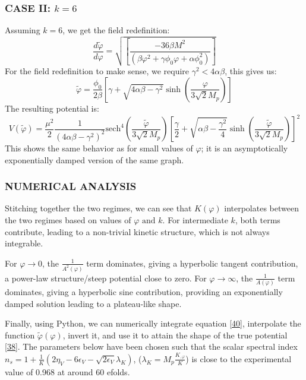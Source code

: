 \documentclass[aps,prd,reprint,preprintnumbers,showpacs,floatfix,nofootinbib,superscript address]{revtex4-2}
\begin{document}
\subsubsection{\textbf{CASE II}: $k = 6$}
Assuming $k=6$,  we get the field redefinition:
\begin{equation}
    \frac{d\tilde{\varphi}}{d\varphi} = \sqrt{\left[\frac{-36 \beta M^2}{(\beta \varphi^2 + \gamma\phi_0\varphi + \alpha \phi_0^2)} \right]}
\end{equation}
For the field redefinition to make sense, we require $\gamma^2 < 4\alpha \beta$, this gives us:
\begin{equation}
    \tilde{\varphi} = \frac{\phi_0}{2\beta} \left[\gamma + \sqrt{4\alpha\beta - \gamma^2} \sinh\left(\frac{\varphi}{3\sqrt{2}M_p}\right) \right]
\end{equation}
The resulting potential is:
\begin{equation}
    V(\tilde{\varphi}) = \frac{\mu^2}{2} \frac{1}{(4\alpha\beta-\gamma^2)^2} \text{sech}^4\left(\frac{\tilde{\varphi}}{3\sqrt{2}M_p} \right) \left[\frac{\gamma }{2} + \sqrt{\alpha\beta-\frac{\gamma^2}{4}} \sinh\left(\frac{\tilde{\varphi}}{3\sqrt{2}M_p} \right) \right]^2
\end{equation}
This shows the same behavior as \cite{barker2024poincaregaugetheoryconformal} for small values of $\varphi$; it is an asymptotically exponentially damped version of the same graph.

\subsubsection{\textbf{NUMERICAL ANALYSIS}}
Stitching together the two regimes, we can see that $K(\varphi)$ interpolates between the two regimes based on values of $\varphi \, \, \text{and}\, \,k$. For intermediate $k$, both terms contribute, leading to a non-trivial kinetic structure, which is not always integrable.

For $\varphi \rightarrow 0$, the $\frac{1}{A^2(\varphi)}$ term dominates, giving a hyperbolic tangent contribution, a power-law structure/steep potential close to zero. For $\varphi \rightarrow \infty$, the $\frac{1}{A(\varphi)}$ term dominates,  giving a hyperbolic sine contribution, providing an exponentially damped solution leading to a plateau-like shape. 

Finally, using Python, we can numerically integrate equation \ref{40}, interpolate the function $\tilde{\varphi}(\varphi)$, invert it, and use it to attain the shape of the true potential \ref{38}. The parameters below have been chosen such that the scalar spectral index $n_s = 1 + \frac{1}{K}(2\eta_V - 6 \epsilon_V -\sqrt{2\epsilon_V}\lambda_K)$, \cite{chung2003running} ($\lambda_K = M_p \frac{K_{,\varphi}}{K}$) is close to the experimental value of 0.968 at around 60 efolds.
\end{document}
